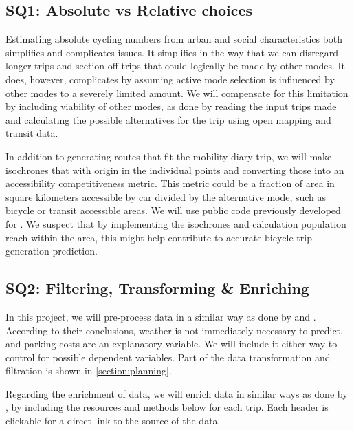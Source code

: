 \documentclass[sigconf, natbib=false, nonacm]{acmart}
\begin{document}
    \subsection{SQ1: Absolute vs Relative choices}
    Estimating absolute cycling numbers from urban and social characteristics both simplifies and complicates issues. It simplifies in the way that we can disregard longer trips and section off trips that could logically be made by other modes. It does, however, complicates by assuming active mode selection is influenced by other modes to a severely limited amount. We will compensate for this limitation by including viability of other modes, as done by reading the input trips made and calculating the possible alternatives for the trip using open mapping and transit data. 

    In addition to generating routes that fit the mobility diary trip, we will make isochrones that with origin in the individual points and converting those into an accessibility competitiveness metric. This metric could be a fraction of area in square kilometers accessible by car divided by the alternative mode, such as bicycle or transit accessible areas. We will use public code previously developed for \textcite{de_geus_preparation_2023}. We suspect that by implementing the isochrones and calculation population reach within the area, this might help contribute to accurate bicycle trip generation prediction.  
    
    \subsection{SQ2: Filtering, Transforming \& Enriching}
    In this project, we will pre-process data in a similar way as done by \textcite{bakri_inzichten_2023} and \textcite{zoutenbier_drukte_2021}. According to their conclusions, weather is not immediately necessary to predict, and parking costs are an explanatory variable. We will include it either way to control for possible dependent variables. Part of the data transformation and filtration is shown in \autoref{section:planning}. 

    Regarding the enrichment of data, we will enrich data in similar ways as done by \textcite{bakri_inzichten_2023}, by including the resources and methods below for each trip. Each header is clickable for a direct link to the source of the data. 
\end{document}
